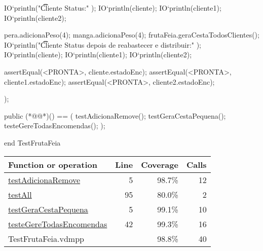 \begin{vdmpp}[breaklines=true]
 IO`println("\t\t Cliente Status:" ); 
 IO`println(cliente);  
 IO`println(cliente1);  
 IO`println(cliente2);  
 
 
 pera.adicionaPeso(4);
 manga.adicionaPeso(4);
  frutaFeia.geraCestaTodosClientes(); 
  IO`println("\t\t Cliente Status depois de reabastecer e distribuir:" );
  IO`println(cliente);  
 IO`println(cliente1);  
 IO`println(cliente2); 
 
 assertEqual(<PRONTA>, cliente.estadoEnc);
 assertEqual(<PRONTA>, cliente1.estadoEnc);
 assertEqual(<PRONTA>, cliente2.estadoEnc);
 
);

public (*@@*)() == (
 testAdicionaRemove();
 testGeraCestaPequena();
 testeGereTodasEncomendas();
);

end TestFrutaFeia
\end{vdmpp}
\bigskip
\begin{longtable}{|l|r|r|r|}
\hline
Function or operation & Line & Coverage & Calls \\
\hline
\hline
\hyperref[testAdicionaRemove:5]{testAdicionaRemove} & 5&98.7\% & 12 \\
\hline
\hyperref[testAll:95]{testAll} & 95&80.0\% & 2 \\
\hline
\hyperref[testGeraCestaPequena:5]{testGeraCestaPequena} & 5&99.1\% & 10 \\
\hline
\hyperref[testeGereTodasEncomendas:42]{testeGereTodasEncomendas} & 42&99.3\% & 16 \\
\hline
\hline
TestFrutaFeia.vdmpp & & 98.8\% & 40 \\
\hline
\end{longtable}

